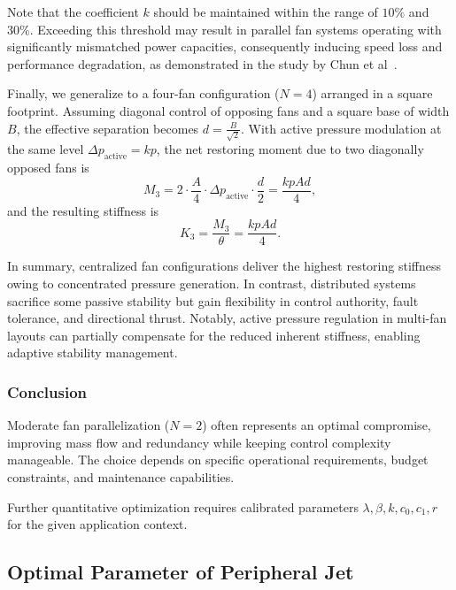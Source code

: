 Note that the coefficient $k$ should be maintained within the range of  $10\%$ and $30\%$. Exceeding this threshold may result in parallel fan systems operating with significantly mismatched power capacities, consequently inducing speed loss and performance degradation, as demonstrated in the study by Chun et al~\cite{chun2011study}.

Finally, we generalize to a four-fan configuration (\( N=4 \)) arranged in a square footprint. Assuming diagonal control of opposing fans and a square base of width \( B \), the effective separation becomes \( d = \frac{B}{\sqrt{2}} \). With active pressure modulation at the same level \( \Delta p_{\text{active}} = k p \), the net restoring moment due to two diagonally opposed fans is
\begin{equation}
    M_3 = 2 \cdot \frac{A}{4} \cdot \Delta p_{\text{active}} \cdot \frac{d}{2} = \frac{k p A d}{4},
\end{equation}
and the resulting stiffness is
\begin{equation}
    K_3 = \frac{M_3}{\theta} = \frac{k p A d}{4}.
\end{equation}

In summary, centralized fan configurations deliver the highest restoring stiffness owing to concentrated pressure generation. In contrast, distributed systems sacrifice some passive stability but gain flexibility in control authority, fault tolerance, and directional thrust. Notably, active pressure regulation in multi-fan layouts can partially compensate for the reduced inherent stiffness, enabling adaptive stability management.

\subsubsection{Conclusion}

Moderate fan parallelization (\( N=2 \)) often represents an optimal compromise, improving mass flow and redundancy while keeping control complexity manageable. The choice depends on specific operational requirements, budget constraints, and maintenance capabilities.

Further quantitative optimization requires calibrated parameters
\(\lambda, \beta, k, c_0, c_1, r\) for the given application context.

\subsection{Optimal Parameter of Peripheral Jet}

